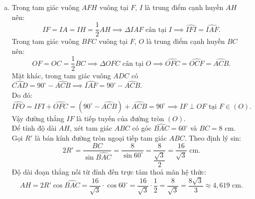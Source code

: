 \begin{bt}
{\begin{enumerate}[a)]
$$	$$
	Vì $DK^2 = AK \cdot KC$ nên ta có đẳng thức:
	$$
	\dfrac{AD^2 \cdot HF^2}{AH^2} = AK \cdot KC.
	$$
	\item Trong tam giác vuông $AFH$ vuông tại $F$, $I$ là trung điểm cạnh huyền $AH$ nên:
	$$
	IF = IA = IH = \dfrac{1}{2}AH \implies \Delta IAF \text{ cân tại } I \implies \widehat{IFI} = \widehat{IAF}.
	$$
	Trong tam giác vuông $BFC$ vuông tại $F$, $O$ là trung điểm cạnh huyền $BC$ nên:
	$$
	OF = OC = \dfrac{1}{2}BC \implies \Delta OFC \text{ cân tại } O \implies \widehat{OFC} = \widehat{OCF} = \widehat{ACB}.
	$$
	Mặt khác, trong tam giác vuông $ADC$ có $\widehat{CAD} = 90^\circ - \widehat{ACB} \implies \widehat{IAF} = 90^\circ - \widehat{ACB}$.\\
	Do đó:
	$$
	\widehat{IFO} = \widehat{IFI} + \widehat{OFC} = (90^\circ - \widehat{ACB}) + \widehat{ACB} = 90^\circ \implies IF \perp OF \text{ tại } F \in (O).
	$$
	Vậy đường thẳng $IF$ là tiếp tuyến của đường tròn $(O)$.\\
	Để tính độ dài $AH$, xét tam giác $ABC$ có góc $\widehat{BAC} = 60^\circ$ và $BC = 8\text{ cm}$.\\
	Gọi $R'$ là bán kính đường tròn ngoại tiếp tam giác $ABC$. Theo định lý sin:
	$$
	2R' = \dfrac{BC}{\sin \widehat{BAC}} = \dfrac{8}{\sin 60^\circ} = \dfrac{8}{\dfrac{\sqrt{3}}{2}} = \dfrac{16}{\sqrt{3}}\text{ cm}.
	$$
	Độ dài đoạn thẳng nối từ đỉnh đến trực tâm thoả mãn hệ thức:
	$$
	AH = 2R' \cos \widehat{BAC} = \dfrac{16}{\sqrt{3}} \cdot \cos 60^\circ = \dfrac{16}{\sqrt{3}} \cdot \dfrac{1}{2} = \dfrac{8}{\sqrt{3}} = \dfrac{8\sqrt{3}}{3} \approx 4{,}619\text{ cm}.
	$$
\end{enumerate}
}
\end{bt}
